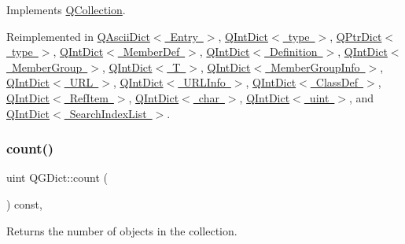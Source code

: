 Implements \mbox{\hyperlink{class_q_collection_a92416cc22907550389aad04c26be2f77}{Q\+Collection}}.



Reimplemented in \mbox{\hyperlink{class_q_ascii_dict_a544cec757a84773073971b0a9d3e5e55}{Q\+Ascii\+Dict$<$ Entry $>$}}, \mbox{\hyperlink{class_q_int_dict_a7cc8164a6c6865c52151920c428d13ed}{Q\+Int\+Dict$<$ type $>$}}, \mbox{\hyperlink{class_q_ptr_dict_a26c647f903df9b82bc131b482f7d6900}{Q\+Ptr\+Dict$<$ type $>$}}, \mbox{\hyperlink{class_q_int_dict_a7cc8164a6c6865c52151920c428d13ed}{Q\+Int\+Dict$<$ Member\+Def $>$}}, \mbox{\hyperlink{class_q_int_dict_a7cc8164a6c6865c52151920c428d13ed}{Q\+Int\+Dict$<$ Definition $>$}}, \mbox{\hyperlink{class_q_int_dict_a7cc8164a6c6865c52151920c428d13ed}{Q\+Int\+Dict$<$ Member\+Group $>$}}, \mbox{\hyperlink{class_q_int_dict_a7cc8164a6c6865c52151920c428d13ed}{Q\+Int\+Dict$<$ T $>$}}, \mbox{\hyperlink{class_q_int_dict_a7cc8164a6c6865c52151920c428d13ed}{Q\+Int\+Dict$<$ Member\+Group\+Info $>$}}, \mbox{\hyperlink{class_q_int_dict_a7cc8164a6c6865c52151920c428d13ed}{Q\+Int\+Dict$<$ U\+R\+L $>$}}, \mbox{\hyperlink{class_q_int_dict_a7cc8164a6c6865c52151920c428d13ed}{Q\+Int\+Dict$<$ U\+R\+L\+Info $>$}}, \mbox{\hyperlink{class_q_int_dict_a7cc8164a6c6865c52151920c428d13ed}{Q\+Int\+Dict$<$ Class\+Def $>$}}, \mbox{\hyperlink{class_q_int_dict_a7cc8164a6c6865c52151920c428d13ed}{Q\+Int\+Dict$<$ Ref\+Item $>$}}, \mbox{\hyperlink{class_q_int_dict_a7cc8164a6c6865c52151920c428d13ed}{Q\+Int\+Dict$<$ char $>$}}, \mbox{\hyperlink{class_q_int_dict_a7cc8164a6c6865c52151920c428d13ed}{Q\+Int\+Dict$<$ uint $>$}}, and \mbox{\hyperlink{class_q_int_dict_a7cc8164a6c6865c52151920c428d13ed}{Q\+Int\+Dict$<$ Search\+Index\+List $>$}}.

\mbox{\label{class_q_g_dict_a13f6cc9bdbfe37db323b47947c1e017c}} 
\subsubsection{\texorpdfstring{count()}{count()}}
{\footnotesize\ttfamily uint Q\+G\+Dict\+::count (\begin{DoxyParamCaption}{ }\end{DoxyParamCaption}) const\hspace{0.3cm}{\ttfamily [inline]}, {\ttfamily [virtual]}}

Returns the number of objects in the collection. 

